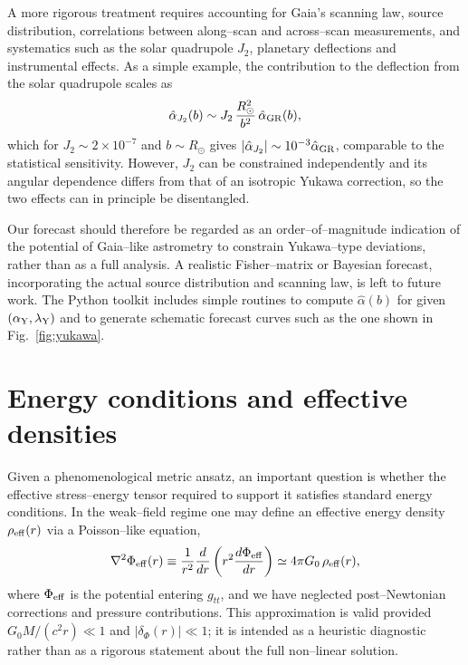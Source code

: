 \documentclass[11pt,a4paper]{article}
\begin{document}
A more rigorous treatment requires accounting for Gaia's scanning law, source distribution, correlations between along--scan and across--scan measurements, and systematics such as the solar quadrupole $J_2$, planetary deflections and instrumental effects. As a simple example, the contribution to the deflection from the solar quadrupole scales as \cite{Will2014}
\begin{equation}
\hat{\alpha}_{J_2}(b) \sim J_2\,\frac{R_\odot^2}{b^2}\,\hat{\alpha}_{\rm GR}(b),
\end{equation}
which for $J_2\sim 2\times 10^{-7}$ and $b\sim R_\odot$ gives $|\hat{\alpha}_{J_2}|\sim 10^{-3}\hat{\alpha}_{\rm GR}$, comparable to the statistical sensitivity. However, $J_2$ can be constrained independently and its angular dependence differs from that of an isotropic Yukawa correction, so the two effects can in principle be disentangled.

Our forecast should therefore be regarded as an order--of--magnitude indication of the potential of Gaia--like astrometry to constrain Yukawa--type deviations, rather than as a full analysis. A realistic Fisher--matrix or Bayesian forecast, incorporating the actual source distribution and scanning law, is left to future work. The Python toolkit includes simple routines to compute $\hat{\alpha}(b)$ for given $(\alpha_{\rm Y},\lambda_{\rm Y})$ and to generate schematic forecast curves such as the one shown in Fig.~\ref{fig:yukawa}.

\section{Energy conditions and effective densities}
\label{sec:energy}

Given a phenomenological metric ansatz, an important question is whether the effective stress--energy tensor required to support it satisfies standard energy conditions. In the weak--field regime one may define an effective energy density $\rho_{\rm eff}(r)$ via a Poisson--like equation,
\begin{equation}
\nabla^2 \Phi_{\rm eff}(r) \equiv \frac{1}{r^2}\frac{d}{dr}\left(r^2\frac{d\Phi_{\rm eff}}{dr}\right)
\simeq 4\pi G_0\,\rho_{\rm eff}(r),
\label{eq:poisson-eff}
\end{equation}
where $\Phi_{\rm eff}$ is the potential entering $g_{tt}$, and we have neglected post--Newtonian corrections and pressure contributions. This approximation is valid provided $G_0M/(c^2r)\ll 1$ and $|\delta_\Phi(r)|\ll 1$; it is intended as a heuristic diagnostic rather than as a rigorous statement about the full non--linear solution.
\end{document}
